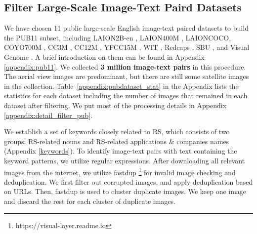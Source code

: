 \documentclass[journal]{IEEEtran}
\begin{document}
\subsection{Filter Large-Scale Image-Text Paird Datasets}
\label{pub11}

We have chosen 11 public large-scale English image-text paired datasets to build the PUB11 subset, including LAION2B-en \cite{laion5b}, LAION400M \cite{laion400m}, LAIONCOCO, COYO700M \cite{coyo700m}, CC3M \cite{cc3m}, CC12M \cite{cc12m}, YFCC15M \cite{yfcc100m}, WIT \cite{wit}, Redcaps \cite{redcaps}, SBU \cite{sbu}, and Visual Genome \cite{vg}. A brief introduction on them can be found in Appendix \ref{appendix:pub11}. We collected \textbf{3 million image-text pairs} in this procedure. The aerial view images are predominant, but there are still some satellite images in the collection. Table~\ref{appendix:pubdataset_stat} in the Appendix lists the statistics for each dataset including the number of images that remained in each dataset after filtering. We put most of the processing details in Appendix \ref{appendix:detail_filter_pub}. 

We establish a set of keywords closely related to RS, which consists of two groups: RS-related nouns and RS-related applications \& companies names (Appendix \ref{keywords}). To identify image-text pairs with text containing the keyword patterns, we utilize regular expressions. After downloading all relevant images from the internet, we utilize fastdup \footnote{https://visual-layer.readme.io} for invalid image checking and deduplication. We first filter out corrupted images, and apply deduplication based on URLs. Then, fastdup is used to cluster duplicate images. We keep one image and discard the rest for each cluster of duplicate images. 
\end{document}

